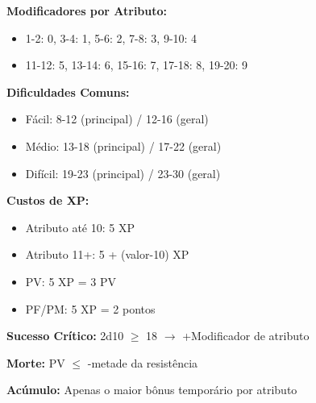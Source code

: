 \textbf{Modificadores por Atributo:}
\begin{itemize}
    \item 1-2: 0, 3-4: 1, 5-6: 2, 7-8: 3, 9-10: 4
    \item 11-12: 5, 13-14: 6, 15-16: 7, 17-18: 8, 19-20: 9
\end{itemize}

\textbf{Dificuldades Comuns:}
\begin{itemize}
    \item Fácil: 8-12 (principal) / 12-16 (geral)
    \item Médio: 13-18 (principal) / 17-22 (geral)  
    \item Difícil: 19-23 (principal) / 23-30 (geral)
\end{itemize}

\textbf{Custos de XP:}
\begin{itemize}
    \item Atributo até 10: 5 XP
    \item Atributo 11+: 5 + (valor-10) XP
    \item PV: 5 XP = 3 PV
    \item PF/PM: 5 XP = 2 pontos
\end{itemize}

\textbf{Sucesso Crítico:} 2d10 $\geq$ 18 $\rightarrow$ +Modificador de atributo

\textbf{Morte:} PV $\leq$ -metade da resistência

\textbf{Acúmulo:} Apenas o maior bônus temporário por atributo
